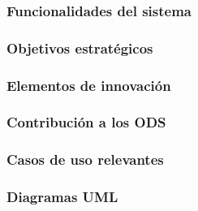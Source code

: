 \subsubsection{Funcionalidades del sistema}

\subsubsection{Objetivos estratégicos}

\subsubsection{Elementos de innovación}

\subsubsection{Contribución a los ODS}

\subsubsection{Casos de uso relevantes}

\subsubsection{Diagramas UML}

